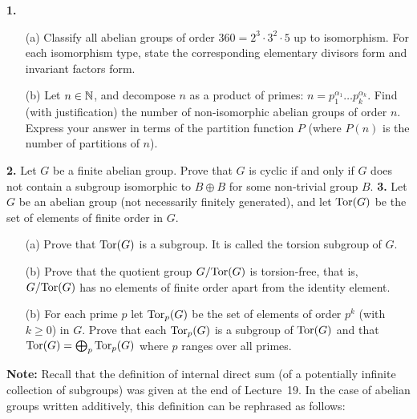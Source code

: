 \documentclass[12pt]{amsart}
\begin{document}
{\bf 1.} 
\begin{itemize}
\item[(a)] Classify all abelian groups of order $360=2^3\cdot 3^2\cdot 5$ up to isomorphism. For each isomorphism type, state the corresponding elementary divisors form and invariant factors form.
\item[(b)] Let $n\in{\mathbb N}$, and decompose $n$ as a product of primes: $n=p_1^{\alpha_1}\ldots p_k^{\alpha_k}$. Find (with justification) the number of non-isomorphic abelian groups of order $n$. Express your answer in terms of the partition function $P$ (where $P(n)$ is the number of partitions of $n$).
\end{itemize}
\skv
{\bf 2.} Let $G$ be a finite abelian group. Prove that $G$ is cyclic if and only if $G$ does not contain a subgroup isomorphic to $B\oplus B$ for some non-trivial group $B$.
\skv
{\bf 3.} \skv Let $G$ be an abelian group (not necessarily finitely generated), and
let ${\rm Tor}(G)$ be the set of elements of finite order in $G$. 
\begin{itemize}
\item[(a)] Prove that ${\rm Tor}(G)$ is a subgroup. It is called the torsion subgroup of $G$.
\item[(b)] Prove that the quotient group $G/{\rm Tor}(G)$ is torsion-free, that is, $G/{\rm Tor}(G)$ has no elements of finite order
apart from the identity element.  
\item[(b)] For each prime $p$ let ${\rm Tor}_p(G)$ be the set of elements of order $p^k$ (with $k\geq 0$)
in $G$. Prove that each ${\rm Tor}_p(G)$ is a subgroup of ${\rm Tor}(G)$ and that ${\rm Tor}(G)=\bigoplus_p {\rm Tor}_p(G)$ where $p$ ranges over all primes.
\end{itemize}
{\bf Note:} Recall that the definition of internal direct sum (of a potentially infinite collection of subgroups) was given at the end of Lecture~19. In the case of abelian groups written additively, this definition can be rephrased as follows:
\end{document}
